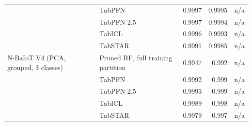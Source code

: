 \begin{tabular}{@{}llrrl@{}}
 & TabPFN & 0.9997 & 0.9995 & n/a \\
 & TabPFN 2.5 & 0.9997 & 0.9994 & n/a \\
 & TabICL & 0.9996 & 0.9993 & n/a \\
 & TabSTAR & 0.9991 & 0.9985 & n/a \\
\addlinespace
N-BaIoT V4 (PCA, grouped, 3 classes) & Pruned RF, full training partition & 0.9947 & 0.992 & n/a \\
 & TabPFN & 0.9992 & 0.999 & n/a \\
 & TabPFN 2.5 & 0.9993 & 0.999 & n/a \\
 & TabICL & 0.9989 & 0.998 & n/a \\
 & TabSTAR & 0.9979 & 0.997 & n/a \\
\bottomrule
\end{tabular}
